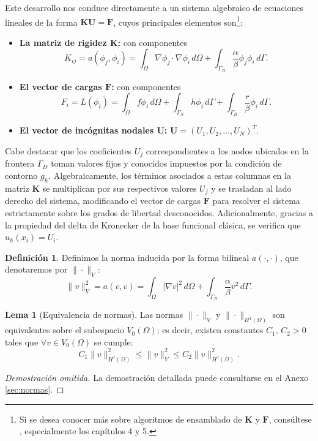 \documentclass[11pt]{book}
\theoremstyle{plain} %
\theoremstyle{definition} %
\newtheorem*{defin}{Definición} %
\theoremstyle{definition} %
\newtheorem{lemma}{Lema}[section]
\begin{document}
Este desarrollo nos conduce directamente a un sistema algebraico de ecuaciones lineales de la forma $\mathbf{K}\mathbf{U} = \mathbf{F}$, cuyos principales elementos son\footnote{Si se desea conocer más sobre algoritmos de ensamblado de $\mathbf{K}$ y $\mathbf{F}$, consúltese \cite{larson_finite_2013}, especialmente los capítulos 4 y 5.}:
\begin{itemize}
    \item \textbf{La matriz de rigidez $\mathbf{K}$: } con componentes $$K_{ij}=a(\phi_j,\phi_i)=\int_{\Omega}\nabla \phi_j \cdot \nabla \phi_i \, d\Omega + \int_{\Gamma_R}\frac{\alpha}{\beta}\phi_j \phi_i \, d\Gamma.$$
    \item \textbf{El vector de cargas $\mathbf{F}$: } con componentes $$F_i=L(\phi_i)=\int_{\Omega}f \phi_i \, d\Omega +\int_{\Gamma_N}h\phi_i \, d\Gamma+\int_{\Gamma_R}\frac{r}{\beta}\phi_i \,d\Gamma.$$
    \item \textbf{El vector de incógnitas nodales $\mathbf{U}$:} $\mathbf{U} = (U_1, U_2, \dots, U_N)^T$.
\end{itemize}

Cabe destacar que los coeficientes $U_j$ correspondientes a los nodos ubicados en la frontera $\Gamma_D$ toman valores fijos y conocidos impuestos por la condición de contorno $g_h$. Algebraicamente, los términos asociados a estas columnas en la matriz $\mathbf{K}$ se multiplican por sus respectivos valores $U_j$ y se trasladan al lado derecho del sistema, modificando el vector de cargas $\mathbf{F}$ para resolver el sistema estrictamente sobre los grados de libertad desconocidos. Adicionalmente, gracias a la propiedad del delta de Kronecker de la base funcional clásica, se verifica que $u_h(x_i)=U_i$.

\begin{defin}
Definimos la norma inducida por la forma bilineal $a( \cdot , \cdot)$, que denotaremos por $\| \cdot \|_V$:
\begin{equation*}
    \|v\|_V^2 = a(v,v) = \int_{\Omega} |\nabla v|^2 \, d\Omega + \int_{\Gamma_R} \frac{\alpha}{\beta} v^2 \, d\Gamma.
\end{equation*}
\end{defin}

\begin{lemma}[Equivalencia de normas]
    \label{lem:equiv_normas}
    Las normas $\|\cdot\|_V$ y $\|\cdot\|_{H^1(\Omega)}$ son equivalentes sobre el subespacio $V_0(\Omega)$; es decir, existen constantes $C_1, \, C_2 > 0$ tales que $\forall v \in V_0(\Omega)$ se cumple:
\begin{equation*}
    C_1 \|v\|_{H^1(\Omega)}^2 \leq \|v\|_{V}^2 \leq C_2 \|v\|_{H^1(\Omega)}^2.
\end{equation*}

\begin{proof}[Demostración omitida]
    La demostración detallada puede consultarse en el Anexo \ref{sec:normas}.
    \renewcommand{\qedsymbol}{}
\end{proof}
\end{lemma}
\end{document}
